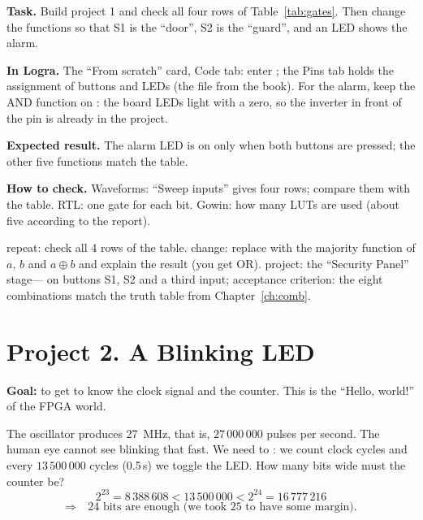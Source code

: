 \begin{diybox}
\textbf{Task.} Build project 1 and check all four rows of Table~\ref{tab:gates}. Then change the functions so that S1 is the ``door'', S2 is the ``guard'', and an LED shows the alarm.

\textbf{In Logra.} The ``From scratch'' card, Code tab: enter ; the Pins tab holds the assignment of buttons and LEDs (the  file from the book). For the alarm, keep the AND function on : the board LEDs light with a zero, so the inverter in front of the pin is already in the project.

\textbf{Expected result.} The alarm LED is on only when both buttons are pressed; the other five functions match the table.

\textbf{How to check.} Waveforms: ``Sweep inputs'' gives four rows; compare them with the table. RTL: one gate for each bit. Gowin: how many LUTs are used (about five according to the report).

 repeat: check all 4 rows of the table.  change: replace  with the majority function of $a$, $b$ and $a\oplus b$ and explain the result (you get OR).  project: the ``Security Panel'' stage--- on buttons S1, S2 and a third input; acceptance criterion: the eight combinations match the truth table from Chapter~\ref{ch:comb}.
\end{diybox}

\section{Project 2. A Blinking LED}

\textbf{Goal:} to get to know the clock signal and the counter. This is the
``Hello, world!'' of the FPGA world.

The oscillator produces \SI{27}{MHz}, that is, $27\,000\,000$ pulses per second.
The human eye cannot see blinking that fast. We need to :
we count clock cycles and every $13\,500\,000$ cycles (0.5\,s) we toggle the
LED. How many bits wide must the counter be?
\[
  2^{23} = 8\,388\,608 < 13\,500\,000 < 2^{24} = 16\,777\,216
\]
\[
  \Rightarrow\quad \text{24 bits are enough (we took 25 to have some margin).}
\]

